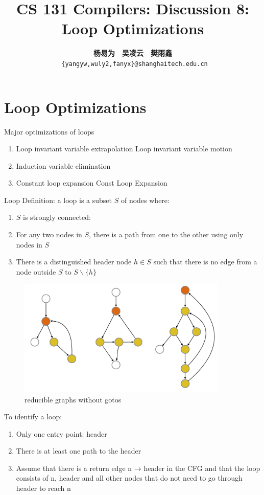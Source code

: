 \documentclass[a4paper]{article}
\title{CS 131 Compilers: Discussion 8: Loop Optimizations}
\author{\textbf{杨易为}~~\textbf{吴凌云}~~\textbf{樊雨鑫} \\ \texttt{ \{yangyw,wuly2,fanyx\}@shanghaitech.edu.cn}}
\theoremstyle{definition}
\begin{document}
\maketitle
\section{Loop Optimizations}
Major optimizations of loops
\begin{enumerate}
    \item Loop invariant variable extrapolation Loop invariant variable motion
    \item Induction variable elimination
    \item Constant loop expansion Const Loop Expansion
\end{enumerate}
Loop Definition: a loop is a subset $S$ of nodes where:
\begin{enumerate}
    \item  $S$ is strongly connected:
\item For any two nodes in $S$, there is a path from one to the other using only nodes in $S$
\item There is a distinguished header node $h \in S$ such that there is no edge from a node outside $S$ to $S \backslash\{h\}$ \cite{cs153lec18}
\end{enumerate}
\begin{figure}[htbp]
  \centering
  \includegraphics[width=10cm]{./img/loop_example.png}
  \caption{reducible graphs without gotos}
\end{figure}

To identify a loop:
\begin{enumerate}
    \item Only one entry point: header
\item There is at least one path to the header
\item Assume that there is a return edge n → header in the CFG and that the loop consists of n, header and all other nodes that do not need to go through header to reach n
\end{enumerate}
\end{document}

